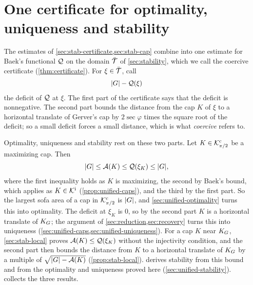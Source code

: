 \section{One certificate for optimality, uniqueness and
stability}\label{sec:unified}

The estimates of \cref{sec:stab-certificate,sec:stab-cap} combine into one
estimate for Baek's functional $\mathcal{Q}$ on the domain $\bar{\mathcal{T}}$ of
\cref{sec:stability}, which we call the coercive certificate
(\cref{thm:certificate}). For $\xi\in\bar{\mathcal{T}}$, call
\[
  \lvert G\rvert-\mathcal{Q}(\xi)
\]
the deficit of $\mathcal{Q}$ at $\xi$. The first part of the certificate says that the
deficit is nonnegative. The second part bounds the distance from the cap $K$ of
$\xi$ to a horizontal translate of Gerver's cap by $2\sec\varphi$ times the
square root of the deficit; so a small deficit forces a small distance, which is
what \emph{coercive} refers to.

Optimality, uniqueness and stability rest on these two parts. Let
$K\in\mathcal{K}^{\mathrm{c}}_{\pi/2}$ be a maximizing cap. Then
\[
  \lvert G\rvert\le\mathcal{A}(K)\le\mathcal{Q}(\xi_K)\le\lvert G\rvert,
\]
where the first inequality holds as $K$ is maximizing, the second by Baek's
bound, which applies as $K\in\mathcal{K}^{\mathrm{i}}$ (\cref{prop:unified-caps}), and the third by
the first part. So the largest sofa area of a cap in $\mathcal{K}^{\mathrm{c}}_{\pi/2}$ is
$\lvert G\rvert$, and \cref{sec:unified-optimality} turns this into optimality.
The deficit at $\xi_K$ is $0$, so by the second part $K$ is a horizontal
translate of $K_G$; the argument of \cref{sec:reduction,sec:recovery} turns
this into uniqueness (\cref{sec:unified-caps,sec:unified-uniqueness}). For a
cap $K$ near $K_G$, \cref{sec:stab-local} proves $\mathcal{A}(K)\le\mathcal{Q}(\xi_K)$ without
the injectivity condition, and the second part then bounds the distance from
$K$ to a horizontal translate of $K_G$ by a multiple of $\sqrt{\lvert G\rvert-\mathcal{A}(K)}$
(\cref{prop:stab-local}).  derives stability from this bound
and from the optimality and uniqueness proved here
(\cref{sec:unified-stability}).  collects the three results.

